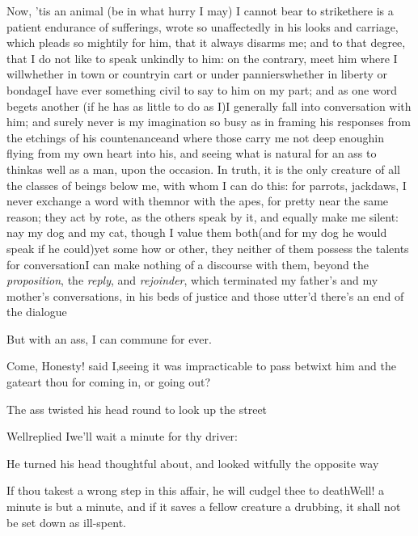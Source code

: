 \documentclass{article}
\begin{document}
Now, ’tis an animal (be in what hurry I may) I cannot bear to strike\tsh there is a
patient endurance of sufferings, wrote so unaffectedly in his looks and carriage,
which pleads so mightily for him, that it always disarms me; and to that degree,
that I do not like to speak unkindly to him: on the contrary,
meet him where I
will\tsk whether in town or country\tsk in cart or under
panniers\tsk whether in liberty or bondage\tsh I have ever
something civil to say to him on my part; and as one word begets
another (if he has as little to do as I)\tsh I generally fall
into conversation with him; and surely never is my imagination
so busy as in framing his responses from the etchings of his
countenance\tsk and where those carry me not deep enough\tsk in
flying from my own heart into his, and seeing what is natural
for an ass to think\tsk as well as a man, upon the occasion. In
truth, it is the only creature of all the classes of beings
below me, with whom I can do this: for parrots, jackdaws,
\etc\@\tsh I never exchange a word with them\tsh nor with the
apes, \etc for pretty near the same reason; they act
by rote, as the others speak by it, and equally make me silent:
nay my dog and my cat, though I value them both\tsh (and for my
dog he would speak if he could)\tsk yet some how or other, they
neither of them possess the talents for conversation\tsh I
can\break
make nothing of a discourse with them, beyond the
\textit{proposition}, the \textit{reply}, and
\textit{rejoinder}, which terminated my father’s and my mother’s
conversations, in his beds of justice \tsh and those utter’d\tsh
there’s an end of the dialogue\tsh

\tsh But with an ass, I can commune for ever.

Come, Honesty! said I,\tsk seeing it was\break
impracticable to pass betwixt him and\break
the gate\tsh art thou for coming in, or\break
going out?

The ass twisted his head round to look up the street\tsh

Well\tsk replied I\tsk we’ll wait a minute for thy driver:

\tsh He turned his head thoughtful about, and looked
witfully the opposite way\tsh

\noindent
{}\break
\tsh If thou takest a wrong step in this affair, he will cudgel thee to
death\tsh Well! a minute is but a minute, and if it saves
a fellow creature a drubbing, it shall not be set down as
ill-spent.
\end{document}
